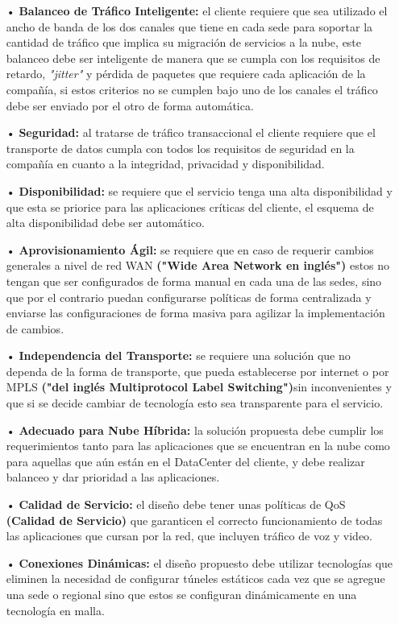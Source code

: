 \begin{itemize}
\item[•] \textbf{Balanceo de Tráfico Inteligente:} el cliente requiere que sea utilizado el ancho de banda de los dos canales que tiene en cada sede para soportar la cantidad de tráfico que implica su migración de servicios a la nube, este balanceo debe ser inteligente de manera que se cumpla con los requisitos de retardo, \textit{"jitter"} y pérdida de paquetes que requiere cada aplicación de la compañía, si estos criterios no se cumplen bajo uno de los canales el tráfico debe ser enviado por el otro de forma automática.

\item[•] \textbf{Seguridad:} al tratarse de tráfico transaccional el cliente requiere que el transporte de datos cumpla con todos los requisitos de seguridad en la compañía en cuanto a la integridad, privacidad y disponibilidad.

\item[•] \textbf{Disponibilidad:} se requiere que el servicio tenga una alta disponibilidad y que esta se priorice para las aplicaciones críticas del cliente, el esquema de alta disponibilidad debe ser automático.

\item[•] \textbf{Aprovisionamiento Ágil:} se requiere que en caso de requerir cambios generales a nivel de red WAN \textbf{("Wide Area Network en inglés")} estos no tengan que ser configurados de forma manual en cada una de las sedes, sino que por el contrario puedan configurarse políticas de forma centralizada y enviarse las configuraciones de forma masiva para agilizar la implementación de cambios.

\item[•] \textbf{Independencia del Transporte:} se requiere una solución que no dependa de la forma de transporte, que pueda establecerse por internet o por MPLS \textbf{("del inglés Multiprotocol Label Switching")}sin inconvenientes y que si se decide cambiar de tecnología esto sea transparente para el servicio.

\item[•] \textbf{Adecuado para Nube Híbrida:} la solución propuesta debe cumplir los requerimientos tanto para las aplicaciones que se encuentran en la nube como para aquellas que aún están en el DataCenter del cliente, y debe realizar balanceo y dar prioridad a las aplicaciones.

\item[•] \textbf{Calidad de Servicio:} el diseño debe tener unas políticas de QoS \textbf{(Calidad de Servicio)} que garanticen el correcto funcionamiento de todas las aplicaciones que cursan por la red, que incluyen tráfico de voz y video.                                 

\item[•] \textbf{Conexiones Dinámicas:} el diseño propuesto debe utilizar tecnologías que eliminen la necesidad de configurar túneles estáticos cada vez que se agregue una sede o regional sino que estos se configuran dinámicamente en una tecnología en malla.
\end{itemize}

